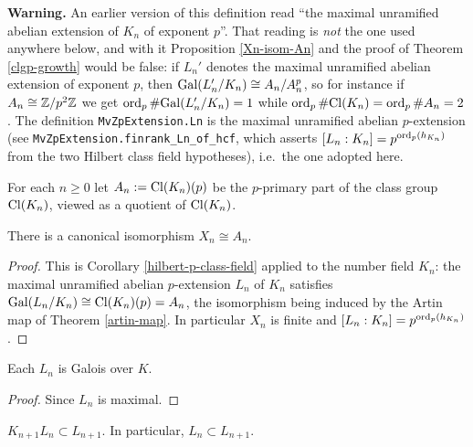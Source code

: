 \begin{remark}
\label{Ln-not-exponent-p}
\textbf{Warning.}
An earlier version of this definition read ``the maximal unramified abelian
extension of $K_n$ of exponent $p$''. That reading is \emph{not} the one used
anywhere below, and with it Proposition \ref{Xn-isom-An} and the proof of
Theorem \ref{clgp-growth} would be false: if $L_n'$ denotes the maximal
unramified abelian extension of exponent $p$, then
${\mathrm{Gal}}(L_n'/K_n)\cong A_n/A_n^p$, so for instance if $A_n\cong{\mathbb {Z}}/p^2{\mathbb {Z}}$ we get
$\operatorname{ord}_p\#{\mathrm{Gal}}(L_n'/K_n)=1$ while $\operatorname{ord}_p\#{\mathrm{Cl}}(K_n)=\operatorname{ord}_p\#A_n=2$.
The {\Lean} definition \texttt{MvZpExtension.Ln} is the maximal unramified
abelian $p$-extension (see \texttt{MvZpExtension.finrank\_Ln\_of\_hcf}, which
asserts $[L_n:K_n]=p^{\operatorname{ord}_p(h_{K_n})}$ from the two Hilbert class field
hypotheses), i.e.~the one adopted here.
\end{remark}

\begin{definition}
\label{Zp-ext-An}
For each $n\geq 0$ let $A_n:={\mathrm{Cl}}(K_n)(p)$ be the
$p$-primary part of the class group ${\mathrm{Cl}}(K_n)$,
viewed as a quotient of ${\mathrm{Cl}}(K_n)$.
\end{definition}

\begin{prop}
\label{Xn-isom-An}
\leanok
There is a canonical isomorphism $X_n\cong A_n$.
\end{prop}

\begin{proof}
\leanok
This is Corollary \ref{hilbert-p-class-field} applied to the number field
$K_n$: the maximal unramified abelian $p$-extension $L_n$ of $K_n$ satisfies
${\mathrm{Gal}}(L_n/K_n)\cong{\mathrm{Cl}}(K_n)(p)=A_n$, the isomorphism being induced by the Artin
map of Theorem \ref{artin-map}.
In particular $X_n$ is finite and $[L_n:K_n]=p^{\operatorname{ord}_p(h_{K_n})}$.
\end{proof}

\begin{lem}
\label{Ln-K-Gal}
\leanok
Each $L_n$ is Galois over $K$.
\end{lem}

\begin{proof}
\leanok
Since $L_n$ is maximal.
\end{proof}

\begin{lem}
\label{Ln-mono}
\leanok
$K_{n+1}L_n\subset L_{n+1}$. In particular, $L_n\subset L_{n+1}$.
\end{lem}

